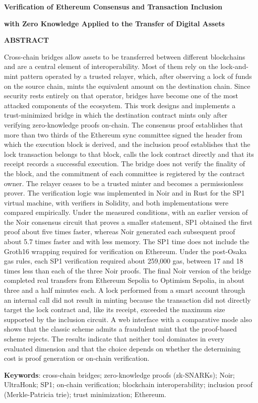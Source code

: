 \centerline{\textbf{\large Verification of Ethereum Consensus and Transaction Inclusion}}
\centerline{\textbf{\large with Zero Knowledge Applied to the Transfer of Digital Assets}}

\vspace{1cm}

\vspace{0.3cm}

\vspace{0.3cm}

\noindent
\textbf{ABSTRACT}

\vspace{0.3cm}

\noindent
Cross-chain bridges allow assets to be transferred between different blockchains and are a
central element of interoperability. Most of them rely on the lock-and-mint pattern operated by a
trusted relayer, which, after observing a lock of funds on the source chain, mints the equivalent
amount on the destination chain. Since security rests entirely on that operator, bridges have
become one of the most attacked components of the ecosystem. This work designs and implements a
trust-minimized bridge in which the destination contract mints only after verifying
zero-knowledge proofs on-chain. The consensus proof establishes that more than two thirds of the
Ethereum sync committee signed the header from which the execution block is derived, and the
inclusion proof establishes that the lock transaction belongs to that block, calls the lock
contract directly and that its receipt records a successful execution. The bridge does not verify
the finality of the block, and the commitment of each committee is registered by the contract
owner. The relayer ceases to be a trusted minter and becomes a permissionless prover. The
verification logic was implemented in Noir and in Rust for the SP1 virtual machine, with verifiers
in Solidity, and both implementations were compared empirically. Under the measured conditions,
with an earlier version of the Noir consensus circuit that proves a smaller statement, SP1 obtained
the first proof about five times faster, whereas Noir generated each subsequent proof about 5.7
times faster and with less memory. The SP1 time does not include the Groth16 wrapping required for
verification on Ethereum. Under the post-Osaka gas rules, each SP1 verification required about
259,000 gas, between 17 and 18 times less than each of the three Noir proofs. The final Noir version of the
bridge completed real transfers from Ethereum Sepolia to Optimism Sepolia, in about three and a
half minutes each. A lock performed from a smart account through an internal call did not result
in minting because the transaction did not directly target the lock contract and, like its
receipt, exceeded the maximum size supported by the inclusion circuit. A web interface with a comparative mode also shows that the classic
scheme admits a fraudulent mint that the proof-based scheme rejects. The results indicate that
neither tool dominates in every evaluated dimension and that the choice depends on whether the
determining cost is proof generation or on-chain verification.

\vspace{0.3cm}

\noindent
\textbf{Keywords}: cross-chain bridges; zero-knowledge proofs (zk-SNARKs); Noir; UltraHonk; SP1;
on-chain verification; blockchain interoperability; inclusion proof (Merkle-Patricia trie); trust
minimization; Ethereum.

